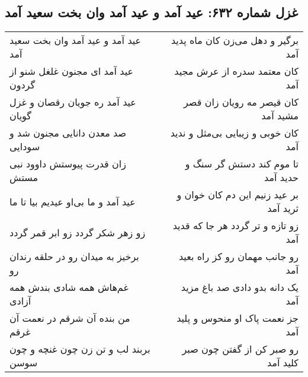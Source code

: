 \begin{center}
\section*{غزل شماره ۶۳۲: عید آمد و عید آمد وان بخت سعید آمد}
\label{sec:0632}
\begin{longtable}{l p{0.5cm} r}
عید آمد و عید آمد وان بخت سعید آمد
&&
برگیر و دهل می‌زن کان ماه پدید آمد
\\
عید آمد ای مجنون غلغل شنو از گردون
&&
کان معتمد سدره از عرش مجید آمد
\\
عید آمد ره جویان رقصان و غزل گویان
&&
کان قیصر مه رویان زان قصر مشید آمد
\\
صد معدن دانایی مجنون شد و سودایی
&&
کان خوبی و زیبایی بی‌مثل و ندید آمد
\\
زان قدرت پیوستش داوود نبی مستش
&&
تا موم کند دستش گر سنگ و حدید آمد
\\
عید آمد و ما بی‌او عیدیم بیا تا ما
&&
بر عید زنیم این دم کان خوان و ثرید آمد
\\
زو زهر شکر گردد زو ابر قمر گردد
&&
زو تازه و تر گردد هر جا که قدید آمد
\\
برخیز به میدان رو در حلقه رندان رو
&&
رو جانب مهمان رو کز راه بعید آمد
\\
غم‌هاش همه شادی بندش همه آزادی
&&
یک دانه بدو دادی صد باغ مزید آمد
\\
من بنده آن شرقم در نعمت آن غرقم
&&
جز نعمت پاک او منحوس و پلید آمد
\\
بربند لب و تن زن چون غنچه و چون سوسن
&&
رو صبر کن از گفتن چون صبر کلید آمد
\\
\end{longtable}
\end{center}
